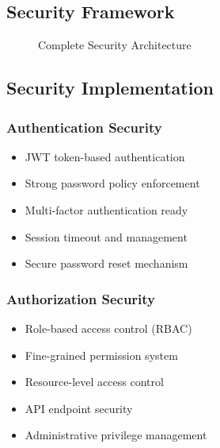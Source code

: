 \documentclass[12pt,a4paper]{article}
\begin{document}
\subsection{Security Framework}

\begin{figure}[H]
\centering
{}
\caption{Complete Security Architecture}
\label{fig:complete-security-architecture}
\end{figure}

\subsection{Security Implementation}

\subsubsection{Authentication Security}
\begin{itemize}
    \item JWT token-based authentication
    \item Strong password policy enforcement
    \item Multi-factor authentication ready
    \item Session timeout and management
    \item Secure password reset mechanism
\end{itemize}

\subsubsection{Authorization Security}
\begin{itemize}
    \item Role-based access control (RBAC)
    \item Fine-grained permission system
    \item Resource-level access control
    \item API endpoint security
    \item Administrative privilege management
\end{itemize}
\end{document}
